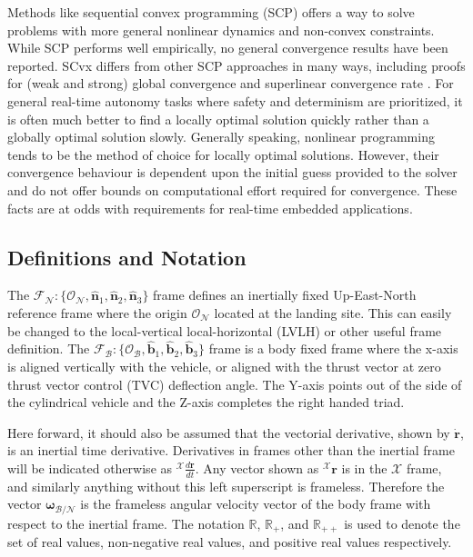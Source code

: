 \documentclass[conf]{new-aiaa}
\begin{document}
Methods like sequential convex programming (SCP) offers a way to solve problems with more general nonlinear dynamics and non-convex constraints. While SCP performs well empirically, no general convergence results have been reported. SCvx differs from other SCP approaches in many ways, including proofs for (weak and strong) global convergence and superlinear convergence rate \cite{mao2016successive}. For general real-time autonomy tasks where safety and determinism are prioritized, it is often much better to find a locally optimal solution quickly rather than a globally optimal solution slowly. Generally speaking, nonlinear programming tends to be the method of choice for locally optimal solutions. However, their convergence behaviour is dependent upon the initial guess provided to the solver and do not offer bounds on computational effort required for convergence. These facts are at odds with requirements for real-time embedded applications.

\subsection{Definitions and Notation}
The $\mathcal{F}_\mathcal{N} : \{\mathcal{O}_\mathcal{N}, \hat{\bm{n}}_1, \hat{\bm{n}}_2, \hat{\bm{n}}_3 \}$ frame defines an inertially fixed Up-East-North reference frame where the origin $\mathcal{O}_\mathcal{N}$ located at the landing site. This can easily be changed to the local-vertical local-horizontal (LVLH) or other useful frame definition. The $\mathcal{F}_\mathcal{B}: \{\mathcal{O}_\mathcal{B}, \hat{\bm{b}}_1, \hat{\bm{b}}_2, \hat{\bm{b}}_3 \}$ frame is a body fixed frame where the x-axis is aligned vertically with the vehicle, or aligned with the thrust vector at zero thrust vector control (TVC) deflection angle. The Y-axis points out of the side of the cylindrical vehicle and the Z-axis completes the right handed triad.

Here forward, it should also be assumed that the vectorial derivative, shown by $\mathbf{\dot{r}}$, is an inertial time derivative. Derivatives in frames other than the inertial frame will be indicated otherwise as $^\mathcal{X}\frac{d \mathbf{r}}{dt}$. Any vector shown as $^\mathcal{X}\mathbf{r}$ is in the $\mathcal{X}$ frame, and similarly anything without this left superscript is frameless. Therefore the vector $\bm{\omega}_{\mathcal{B/N}}$ is the frameless angular velocity vector of the body frame with respect to the inertial frame. The notation $\mathbb{R}$, $\mathbb{R}_+$, and $\mathbb{R}_{++}$ is used to denote the set of real values, non-negative real values, and positive real values respectively.
\end{document}
